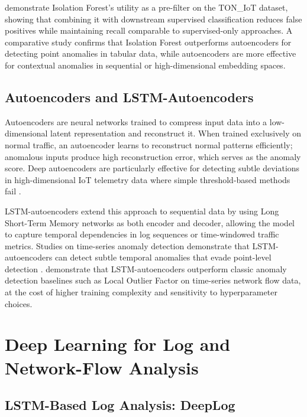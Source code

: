 \documentclass[12pt,a4paper]{report}
\begin{document}
\citet{alsaedi2020} demonstrate Isolation Forest's utility as a pre-filter on the TON\_IoT dataset, showing that combining it with downstream supervised classification reduces false positives while maintaining recall comparable to supervised-only approaches. A comparative study \citep{nassif2021} confirms that Isolation Forest outperforms autoencoders for detecting point anomalies in tabular data, while autoencoders are more effective for contextual anomalies in sequential or high-dimensional embedding spaces.

\subsection{Autoencoders and LSTM-Autoencoders}
\label{sec:autoencoders}

Autoencoders are neural networks trained to compress input data into a low-dimensional latent representation and reconstruct it. When trained exclusively on normal traffic, an autoencoder learns to reconstruct normal patterns efficiently; anomalous inputs produce high reconstruction error, which serves as the anomaly score. Deep autoencoders are particularly effective for detecting subtle deviations in high-dimensional IoT telemetry data where simple threshold-based methods fail \citep{moustafa2021}.

LSTM-autoencoders extend this approach to sequential data by using Long Short-Term Memory networks as both encoder and decoder, allowing the model to capture temporal dependencies in log sequences or time-windowed traffic metrics. Studies on time-series anomaly detection demonstrate that LSTM-autoencoders can detect subtle temporal anomalies that evade point-level detection \citep{malhotra2016}. \citet{park2023} demonstrate that LSTM-autoencoders outperform classic anomaly detection baselines such as Local Outlier Factor on time-series network flow data, at the cost of higher training complexity and sensitivity to hyperparameter choices.

\section{Deep Learning for Log and Network-Flow Analysis}
\label{sec:deeplearning}

\subsection{LSTM-Based Log Analysis: DeepLog}
\label{sec:deeplog}
\end{document}
